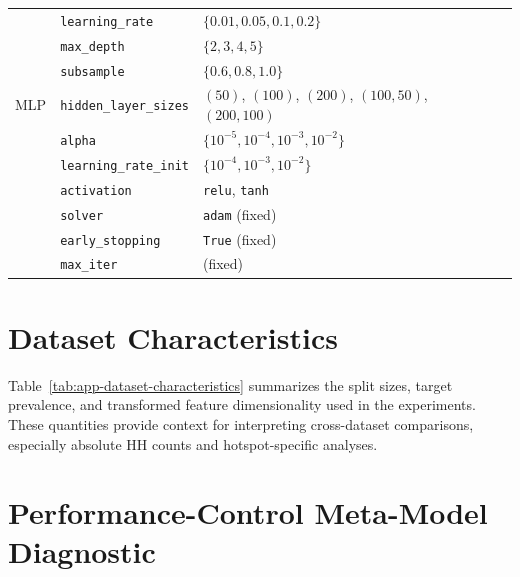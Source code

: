 \begin{table}[htbp]
\begin{tabular}{
@{}
>{\RaggedRight\arraybackslash}p{}
>{\RaggedRight\arraybackslash}p{}
>{\RaggedRight\arraybackslash}p{}
@{}
}
    & \texttt{learning\_rate} & $\{0.01,0.05,0.1,0.2\}$ \\
    & \texttt{max\_depth} & $\{2,3,4,5\}$ \\
    & \texttt{subsample} & $\{0.6,0.8,1.0\}$ \\
\midrule
MLP & \texttt{hidden\_layer\_sizes} & $(50)$, $(100)$, $(200)$, $(100,50)$, $(200,100)$ \\
    & \texttt{alpha} & $\{10^{-5},10^{-4},10^{-3},10^{-2}\}$ \\
    & \texttt{learning\_rate\_init} & $\{10^{-4},10^{-3},10^{-2}\}$ \\
    & \texttt{activation} & \texttt{relu}, \texttt{tanh} \\
    & \texttt{solver} & \texttt{adam} (fixed) \\
    & \texttt{early\_stopping} & \texttt{True} (fixed) \\
    & \texttt{max\_iter} & 1000 (fixed) \\
\bottomrule
\end{tabular}
\end{table}

\section{Dataset Characteristics}
\label{app:dataset-characteristics}

Table~\ref{tab:app-dataset-characteristics} summarizes the split sizes, target prevalence,
and transformed feature dimensionality used in the experiments. These quantities provide
context for interpreting cross-dataset comparisons, especially absolute HH counts and
hotspot-specific analyses.

\begin{table}[htbp]
\centering
\caption{Dataset characteristics after train--validation--test splitting and preprocessing.
The positive rate is computed on the full dataset. The transformed dimension refers to the
feature representation after imputation, standardization, and one-hot encoding.}
\label{tab:app-dataset-characteristics}
\vspace{0.4em}

\end{table}

\section{Performance-Control Meta-Model Diagnostic}
\label{app:meta-model-diagnostic}

